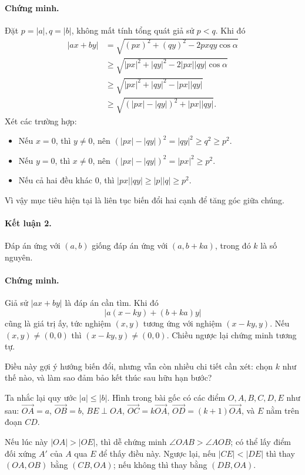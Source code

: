 \documentclass[11pt]{article}
\newcommand{\abs}[1]{\left|#1\right|}
\newcommand{\vect}[1]{\overrightarrow{#1}}
\begin{document}
\paragraph{Chứng minh.}
Đặt $p=\abs a,q=\abs b$, không mất tính tổng quát giả sử $p<q$. Khi đó
\[
\begin{aligned}
  \abs{ax+by}
    &=\sqrt{(px)^2+(qy)^2-2pxqy\cos\alpha}\\
    &\ge \sqrt{\abs{px}^2+\abs{qy}^2-2\abs{px}\abs{qy}\cos\alpha}\\
    &\ge \sqrt{\abs{px}^2+\abs{qy}^2-\abs{px}\abs{qy}}\\
    &\ge \sqrt{(\abs{px}-\abs{qy})^2+\abs{px}\abs{qy}}.
\end{aligned}
\]
Xét các trường hợp:
\begin{itemize}
  \item Nếu $x=0$, thì $y\ne 0$, nên
  $(\abs{px}-\abs{qy})^2=\abs{qy}^2\ge q^2\ge p^2$.
  \item Nếu $y=0$, thì $x\ne 0$, nên
  $(\abs{px}-\abs{qy})^2=\abs{px}^2\ge p^2$.
  \item Nếu cả hai đều khác $0$, thì $\abs{px}\abs{qy}\ge \abs p\abs q\ge p^2$.
\end{itemize}
Vì vậy mục tiêu hiện tại là liên tục biến đổi hai cạnh để tăng góc giữa chúng.

\paragraph{Kết luận 2.}
Đáp án ứng với $(a,b)$ giống đáp án ứng với $(a,b+ka)$, trong đó $k$ là số
nguyên.

\paragraph{Chứng minh.}
Giả sử $\abs{ax+by}$ là đáp án cần tìm. Khi đó
\[
  \abs{a(x-ky)+(b+ka)y}
\]
cũng là giá trị ấy, tức nghiệm $(x,y)$ tương ứng với nghiệm $(x-ky,y)$. Nếu
$(x,y)\ne(0,0)$ thì $(x-ky,y)\ne(0,0)$. Chiều ngược lại chứng minh tương tự.

Điều này gợi ý hướng biến đổi, nhưng vẫn còn nhiều chi tiết cần xét: chọn $k$
như thế nào, và làm sao đảm bảo kết thúc sau hữu hạn bước?

Ta nhắc lại quy ước $\abs a\le\abs b$. Hình trong bài gốc có các điểm
$O,A,B,C,D,E$ như sau: $\vect{OA}=a$, $\vect{OB}=b$, $BE\perp OA$,
$\vect{OC}=k\vect{OA}$, $\vect{OD}=(k+1)\vect{OA}$, và $E$ nằm trên đoạn
$CD$.

Nếu lúc này $\abs{OA}>\abs{OE}$, thì dễ chứng minh
$\angle OAB>\angle AOB$; có thể lấy điểm đối xứng $A'$ của $A$ qua $E$ để thấy
điều này. Ngược lại, nếu $\abs{CE}<\abs{DE}$ thì thay $(OA,OB)$ bằng
$(CB,OA)$; nếu không thì thay bằng $(DB,OA)$.
\end{document}
